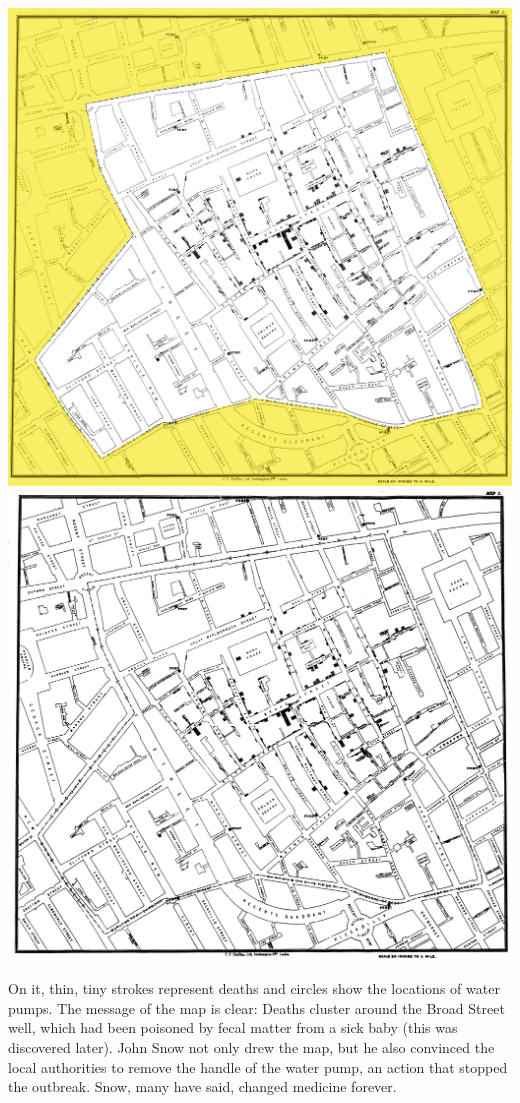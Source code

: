 \documentclass[12pt]{article}
\begin{document}
\includegraphics{snowmap_1854}
\includegraphics[scale=0.1]{Snow-cholera-map-1}

On it, thin, tiny strokes represent deaths and circles show the locations of water pumps. The message of the map is clear: Deaths cluster around the Broad Street well, which had been poisoned by fecal matter from a sick baby (this was discovered later). John Snow not only drew the map, but he also convinced the local authorities to remove the handle of the water pump, an action that stopped the outbreak. Snow, many have said, changed medicine forever. 
\end{document}
